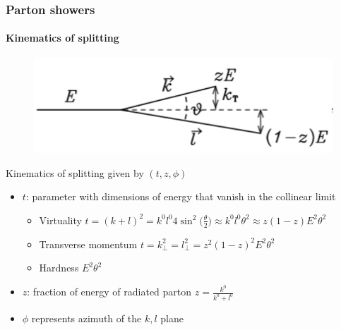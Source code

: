 \documentclass[aspectratio=43]{beamer}
\begin{document}
\begin{frame}

	\frametitle{Parton showers}
	\framesubtitle{Kinematics of splitting}
	
	\begin{figure}
		\includegraphics[width = 5 cm]{plots/shower_kinematics.png}
	\end{figure}
	
	\footnotesize Kinematics of splitting given by $(t, z, \phi)$
	\begin{itemize}
		\item $t$: parameter with dimensions of energy that vanish in the collinear limit \\
		\begin{itemize}
			\item Virtuality $t = (k + l)^{2} = k^{0}l^{0}4\sin^{2}\bigg( \frac{\theta}{2} \bigg) \approx k^{0}l^{0}\theta^{2} \approx z(1 - z)E^{2}\theta^{2}$
			\item Transverse momentum $t = k_{\perp}^{2} = l_{\perp}^{2} = z^{2}(1 - z)^{2}E^{2}\theta^{2}$
			\item Hardness $E^{2}\theta^{2}$
		\end{itemize}
		\item $z$: fraction of energy of radiated parton $z = \frac{k^{0}}{k^{0} + l^{0}}$
		\item $\phi$ represents azimuth of the $k, l$ plane
	\end{itemize}
	
\end{frame}
\end{document}
